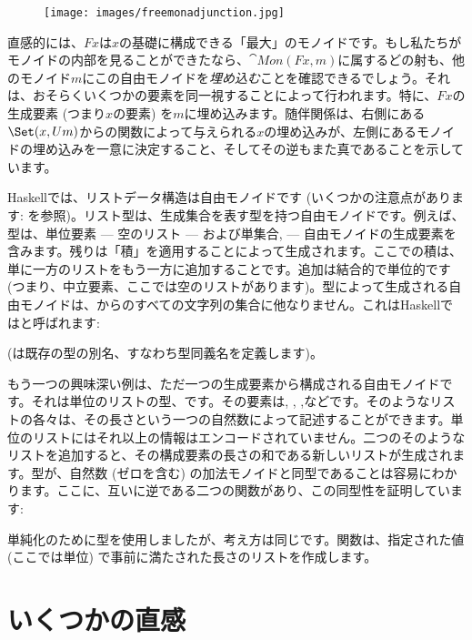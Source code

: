 \begin{figure}[H]
  \centering
  \texttt{[image: images/freemonadjunction.jpg]}
\end{figure}

\noindent
直感的には、$F x$は$x$の基礎に構成できる「最大」のモノイドです。もし私たちがモノイドの内部を見ることができたなら、$\cat{Mon}(F x, m)$に属するどの射も、他のモノイド$m$にこの自由モノイドを\emph{埋め込む}ことを確認できるでしょう。それは、おそらくいくつかの要素を同一視することによって行われます。特に、$F x$の生成要素 (つまり$x$の要素) を$m$に埋め込みます。随伴関係は、右側にある$\Set(x, U m)$からの関数によって与えられる$x$の埋め込みが、左側にあるモノイドの埋め込みを一意に決定すること、そしてその逆もまた真であることを示しています。

Haskellでは、リストデータ構造は自由モノイドです (いくつかの注意点があります: を参照)。リスト型\code{{[}a{]}}は、生成集合を表す型を持つ自由モノイドです。例えば、型\code{{[}Char{]}}は、単位要素 --- 空のリスト\code{{[}{]}} --- および単集合\code{{[}'a'{]}}, \code{{[}'b'{]}} --- 自由モノイドの生成要素を含みます。残りは「積」を適用することによって生成されます。ここでの積は、単に一方のリストをもう一方に追加することです。追加は結合的で単位的です (つまり、中立要素、ここでは空のリストがあります)。型によって生成される自由モノイドは、からのすべての文字列の集合に他なりません。これはHaskellではと呼ばれます:

 (は既存の型の別名、すなわち型同義名を定義します)。

もう一つの興味深い例は、ただ一つの生成要素から構成される自由モノイドです。それは単位のリストの型、\code{{[}(){]}}です。その要素は\code{{[}{]}}, \code{{[}(){]}}, \code{{[}(), (){]}},などです。そのようなリストの各々は、その長さという一つの自然数によって記述することができます。単位のリストにはそれ以上の情報はエンコードされていません。二つのそのようなリストを追加すると、その構成要素の長さの和である新しいリストが生成されます。型\code{{[}(){]}}が、自然数 (ゼロを含む) の加法モノイドと同型であることは容易にわかります。ここに、互いに逆である二つの関数があり、この同型性を証明しています:

単純化のために型を使用しましたが、考え方は同じです。関数は、指定された値 (ここでは単位) で事前に満たされた長さのリストを作成します。

\section{いくつかの直感}

